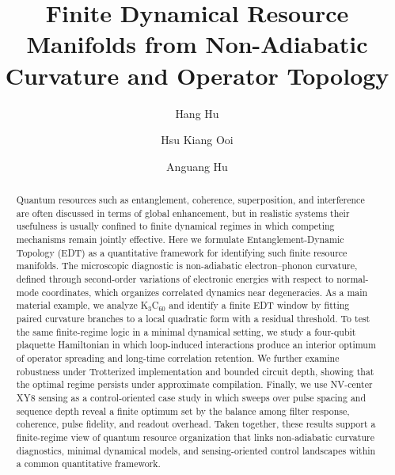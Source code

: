 \documentclass[aps,prx,reprint,superscriptaddress,longbibliography,floatfix]{revtex4-2}
\begin{document}
\title{Finite Dynamical Resource Manifolds from Non-Adiabatic Curvature and Operator Topology}

\author{Hang Hu}
\author{Hsu Kiang Ooi}
\author{Anguang Hu}

\begin{abstract}
Quantum resources such as entanglement, coherence, superposition, and interference are often discussed in terms of global enhancement, but in realistic systems their usefulness is usually confined to finite dynamical regimes in which competing mechanisms remain jointly effective. Here we formulate Entanglement-Dynamic Topology (EDT) as a quantitative framework for identifying such finite resource manifolds. The microscopic diagnostic is non-adiabatic electron--phonon curvature, defined through second-order variations of electronic energies with respect to normal-mode coordinates, which organizes correlated dynamics near degeneracies. As a main material example, we analyze K$_3$C$_{60}$ and identify a finite EDT window by fitting paired curvature branches to a local quadratic form with a residual threshold. To test the same finite-regime logic in a minimal dynamical setting, we study a four-qubit plaquette Hamiltonian in which loop-induced interactions produce an interior optimum of operator spreading and long-time correlation retention. We further examine robustness under Trotterized implementation and bounded circuit depth, showing that the optimal regime persists under approximate compilation. Finally, we use NV-center XY8 sensing as a control-oriented case study in which sweeps over pulse spacing and sequence depth reveal a finite optimum set by the balance among filter response, coherence, pulse fidelity, and readout overhead. Taken together, these results support a finite-regime view of quantum resource organization that links non-adiabatic curvature diagnostics, minimal dynamical models, and sensing-oriented control landscapes within a common quantitative framework.
\end{abstract}

\maketitle












\end{document}
